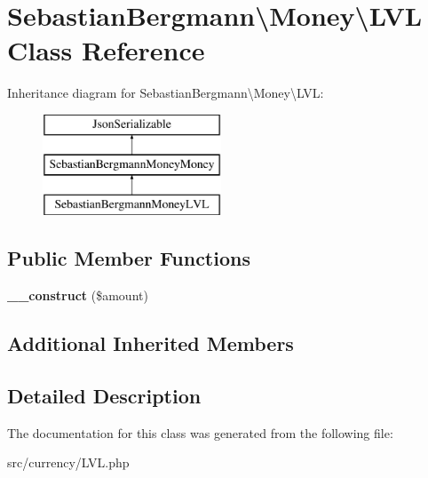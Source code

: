 \hypertarget{classSebastianBergmann_1_1Money_1_1LVL}{}\section{Sebastian\+Bergmann\textbackslash{}Money\textbackslash{}L\+V\+L Class Reference}
\label{classSebastianBergmann_1_1Money_1_1LVL}
Inheritance diagram for Sebastian\+Bergmann\textbackslash{}Money\textbackslash{}L\+V\+L\+:\begin{figure}[H]
\begin{center}
\leavevmode
\includegraphics[height=3.000000cm]{classSebastianBergmann_1_1Money_1_1LVL}
\end{center}
\end{figure}
\subsection*{Public Member Functions}
\begin{DoxyCompactItemize}
\item 
\hypertarget{classSebastianBergmann_1_1Money_1_1LVL_a3acc06aeb229c996d3478eef4136a512}{}{\bfseries \+\_\+\+\_\+construct} (\$amount)\label{classSebastianBergmann_1_1Money_1_1LVL_a3acc06aeb229c996d3478eef4136a512}

\end{DoxyCompactItemize}
\subsection*{Additional Inherited Members}


\subsection{Detailed Description}


The documentation for this class was generated from the following file\+:\begin{DoxyCompactItemize}
\item 
src/currency/L\+V\+L.\+php\end{DoxyCompactItemize}
